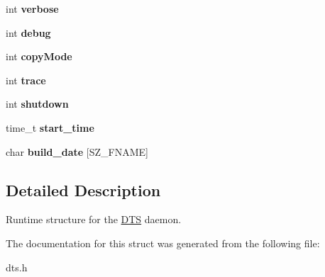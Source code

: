 \begin{CompactItemize}
\item 
\hypertarget{structDTS_a99533b9c7774168426d51838e57fc5c}{
int \textbf{verbose}}
\label{structDTS_a99533b9c7774168426d51838e57fc5c}

\item 
\hypertarget{structDTS_1b9ddb3b4a58647a03e07549e6703df9}{
int \textbf{debug}}
\label{structDTS_1b9ddb3b4a58647a03e07549e6703df9}

\item 
\hypertarget{structDTS_8f889724abb2fce81678917ead76e567}{
int \textbf{copyMode}}
\label{structDTS_8f889724abb2fce81678917ead76e567}

\item 
\hypertarget{structDTS_854bdd3749274b041d3a80109bed2b43}{
int \textbf{trace}}
\label{structDTS_854bdd3749274b041d3a80109bed2b43}

\item 
\hypertarget{structDTS_477812f9f2c098628f476936efca503b}{
int \textbf{shutdown}}
\label{structDTS_477812f9f2c098628f476936efca503b}

\item 
\hypertarget{structDTS_fb6b4e41a95e8dc504a90bb61fb5aa34}{
time\_\-t \textbf{start\_\-time}}
\label{structDTS_fb6b4e41a95e8dc504a90bb61fb5aa34}

\item 
\hypertarget{structDTS_087c7d327f4129e8ea545faafe7c7800}{
char \textbf{build\_\-date} \mbox{[}SZ\_\-FNAME\mbox{]}}
\label{structDTS_087c7d327f4129e8ea545faafe7c7800}

\end{CompactItemize}


\subsection{Detailed Description}
Runtime structure for the \hyperlink{structDTS}{DTS} daemon. 

The documentation for this struct was generated from the following file:\begin{CompactItemize}
\item 
dts.h\end{CompactItemize}

